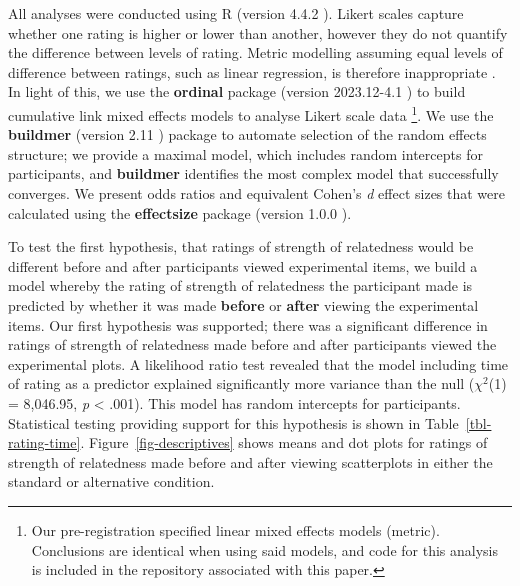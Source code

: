 \documentclass[sigconf]{acmart}
\begin{document}
All analyses were conducted using R (version 4.4.2 \citep{rcore}).
Likert scales capture whether one rating is higher or lower than
another, however they do not quantify the difference between levels of
rating. Metric modelling assuming equal levels of difference between
ratings, such as linear regression, is therefore inappropriate
\citep{liddell_2018}. In light of this, we use the \textbf{ordinal}
package (version 2023.12-4.1 \citep{ordinal}) to build cumulative link
mixed effects models to analyse Likert scale data \footnote{Our
  pre-registration specified linear mixed effects models (metric).
  Conclusions are identical when using said models, and code for this
  analysis is included in the repository associated with this paper.}.
We use the \textbf{buildmer} (version 2.11 \citep{buildmer}) package to
automate selection of the random effects structure; we provide a maximal
model, which includes random intercepts for participants, and
\textbf{buildmer} identifies the most complex model that successfully
converges. We present odds ratios and equivalent Cohen's \emph{d} effect
sizes that were calculated using the \textbf{effectsize} package
(version 1.0.0 \citep{effectsize}).

To test the first hypothesis, that ratings of strength of relatedness
would be different before and after participants viewed experimental
items, we build a model whereby the rating of strength of relatedness
the participant made is predicted by whether it was made \textbf{before}
or \textbf{after} viewing the experimental items. Our first hypothesis
was supported; there was a significant difference in ratings of strength
of relatedness made before and after participants viewed the
experimental plots. A likelihood ratio test revealed that the model
including time of rating as a predictor explained significantly more
variance than the null (\(\chi^2\)(1) = 8,046.95, \emph{p} \textless{}
.001). This model has random intercepts for participants. Statistical
testing providing support for this hypothesis is shown in
Table~\ref{tbl-rating-time}. Figure~\ref{fig-descriptives} shows means
and dot plots for ratings of strength of relatedness made before and
after viewing scatterplots in either the standard or alternative
condition.

\begin{table}

\caption{\label{tbl-rating-time}Statistics for the significant main
effect of rating time. Odds ratio and the equivalent Cohen's \textit{d}
value is also supplied.}


\end{table}%
\end{document}
